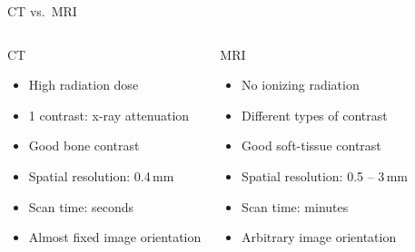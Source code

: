 \begin{frame}[c]{CT vs.~MRI}

    \begin{columns}[c,onlytextwidth]
        \centering{}
        \begin{block}{CT}
            \begin{itemize}
                \small
                \item High radiation dose
                \item 1 contrast: x-ray attenuation
                \item Good bone contrast
                \item Spatial resolution: 0.4\,mm
                \item Scan time: seconds
                \item Almost fixed image orientation
            \end{itemize}
        \end{block}%
        \begin{block}{MRI}
            \centering{}
            \begin{itemize}
                \small
                \item No ionizing radiation
                \item Different types of contrast
                \item Good soft-tissue contrast
                \item Spatial resolution: 0.5 -- 3\,mm
                \item Scan time: minutes
                \item Arbitrary image orientation
            \end{itemize}
        \end{block}

    \end{columns}

\end{frame}
